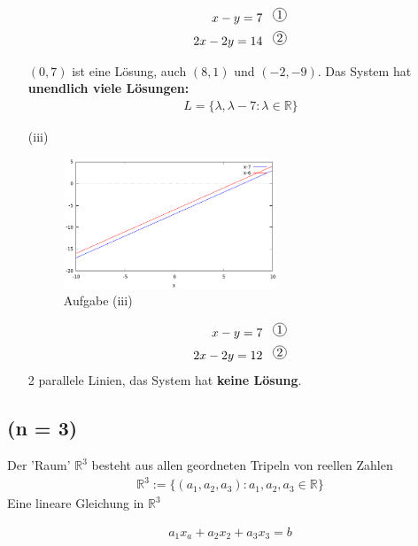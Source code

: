 \documentclass[11pt]{report}
\newcommand*\mycirc[1]{%
  \begin{tikzpicture}
    \node[draw,circle,inner sep=1pt] {#1};
  \end{tikzpicture}}
\newcommand*\Zb[1] {\mathbb{#1}}
\begin{document}
\begin{itemize}
\begin{align}
x - y = 7 \hspace*{0.3cm}\mycirc{1}\\
2x - 2y = 14 \hspace*{0.3cm}\mycirc{2}
\end{align}
    
$(0,7)$ ist eine Lösung, auch $(8,1)$ und $(-2,-9)$.
Das System hat \textbf{unendlich viele Lösungen:}
\begin{align}
L = \{\lambda, \lambda-7: \lambda \in \Zb{R}\}
\end{align}
    
\item[(iii)]

\begin{figure}[ht]
\centering
\includegraphics[width=0.6\textwidth]{img/iii.png}
\caption{Aufgabe (iii)}
\end{figure}

\begin{align}
x - y = 7 \hspace*{0.3cm}\mycirc{1}\\
2x - 2y = 12 \hspace*{0.3cm}\mycirc{2}
\end{align}
2 parallele Linien, das System hat \textbf{keine Lösung}.
\end{itemize}

\subsection{(n = 3)}
Der 'Raum' $\Zb{R}^{3}$ besteht aus allen geordneten Tripeln von reellen Zahlen
\begin{align}
\Zb{R}^{3} := \{(a_1,a_2,a_3):a_1, a_2, a_3 \in \Zb{R}\}
\end{align}
Eine lineare Gleichung in $\Zb{R}^{3}$

\begin{align}
a_1 x_a + a_2 x_2 + a_3 x_3 = b
\end{align}
\end{document}
